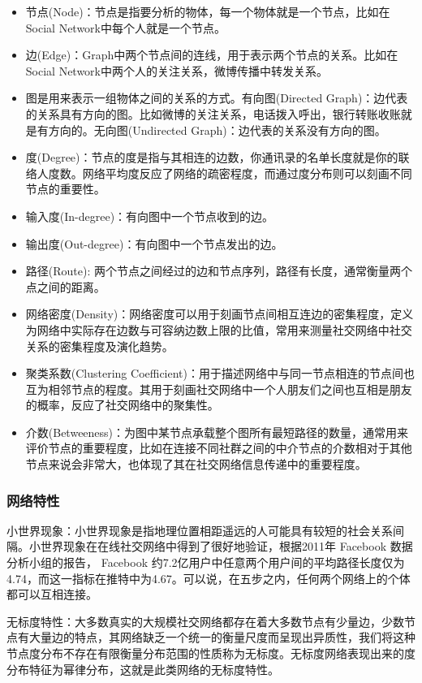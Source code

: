 \documentclass[12pt]{report}
\begin{document}
				\begin{itemize}
					\item 节点(Node)：节点是指要分析的物体，每一个物体就是一个节点，比如在Social Network中每个人就是一个节点。
					\item 边(Edge)：Graph中两个节点间的连线，用于表示两个节点的关系。比如在Social Network中两个人的关注关系，微博传播中转发关系。
					\item 图是用来表示一组物体之间的关系的方式。有向图(Directed Graph)：边代表的关系具有方向的图。比如微博的关注关系，电话拨入呼出，银行转账收账就是有方向的。无向图(Undirected Graph)：边代表的关系没有方向的图。
					\item 度(Degree)：节点的度是指与其相连的边数，你通讯录的名单长度就是你的联络人度数。网络平均度反应了网络的疏密程度，而通过度分布则可以刻画不同节点的重要性。
					\item 输入度(In-degree)：有向图中一个节点收到的边。
					\item 输出度(Out-degree)：有向图中一个节点发出的边。
					\item 路径(Route): 两个节点之间经过的边和节点序列，路径有长度，通常衡量两个点之间的距离。
					\item 网络密度(Density)：网络密度可以用于刻画节点间相互连边的密集程度，定义为网络中实际存在边数与可容纳边数上限的比值，常用来测量社交网络中社交关系的密集程度及演化趋势。
					\item 聚类系数(Clustering Coefficient)：用于描述网络中与同一节点相连的节点间也互为相邻节点的程度。其用于刻画社交网络中一个人朋友们之间也互相是朋友的概率，反应了社交网络中的聚集性。
					\item 介数(Betweeness)：为图中某节点承载整个图所有最短路径的数量，通常用来评价节点的重要程度，比如在连接不同社群之间的中介节点的介数相对于其他节点来说会非常大，也体现了其在社交网络信息传递中的重要程度。
				\end{itemize}
			
			\subsubsection{网络特性}
			
				小世界现象：小世界现象是指地理位置相距遥远的人可能具有较短的社会关系间隔。小世界现象在在线社交网络中得到了很好地验证，根据2011年 Facebook 数据分析小组的报告， Facebook 约7.2亿用户中任意两个用户间的平均路径长度仅为4.74，而这一指标在推特中为4.67。可以说，在五步之内，任何两个网络上的个体都可以互相连接。
				
				无标度特性：大多数真实的大规模社交网络都存在着大多数节点有少量边，少数节点有大量边的特点，其网络缺乏一个统一的衡量尺度而呈现出异质性，我们将这种节点度分布不存在有限衡量分布范围的性质称为无标度。无标度网络表现出来的度分布特征为幂律分布，这就是此类网络的无标度特性。
			
\end{document}
